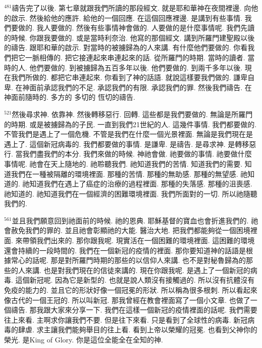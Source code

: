 \documentclass{book}
\begin{document}
$^{481}$禱告完了以後.
第七章就跟我們所讀的那段經文.
就是耶和華神在夜間裡邊.
向他的啟示.
然後給他的應許.
給他的一個回應.
在這個回應裡邊.
是講到有些事情.
我們要做的.
我人要做的.
然後有些事情神會做的.
人要做的是什麼事情呢.
我們先讀的時候.
你跟我要做的.
或是當時利奈治.
他寫的那個經文.
講到所羅門建聖殿以後的禱告.
跟耶和華的啟示.
對當時的被擄歸為的人來講.
有什麼他們要做的.
你看我們把它一脈相傳的.
把它接連起來串連起來的話.
從所羅門的時期.
當時的讀者.
當時的人.
他們要做的.
到被擄歸為五百多年以後.
他們要做的.
到兩千多年以後.
現在我們所做的.
都把它串連起來.
你看到了神的話語.
就說這樣要我們做的.
謙卑自卑.
在神面前承認我們的不足.
承認我們的有限.
承認我們的罪.
然後我們禱告.
在神面前隨時的.
多方的 多切的 恆切的禱告.

$^{521}$然後尋求神.
依靠神.
然後轉移惡行.
回轉.
這些都是我們要做的.
無論是所羅門的時期.
或是被擄歸為的子民.
一直到我們21世紀的人.
這幾件事情.
我們都要做的.
不管我們是遇上了一個危機.
不管是我們在什麼一個光景裡面.
無論是我們現在是遇上了.
這個新冠病毒的.
我們都要做的事情.
是謙卑.
是禱告.
是尋求神.
是轉移惡行.
當我們盡我們的本分.
我們來做的時候.
神祂會做.
祂要做的事情.
祂要做什麼事情呢.
祂會在天上隨地的.
祂聆聽我們.
祂知道我們的苦情.
知道我們的需要.
知道我們在一種被隔離的環境裡面.
那種的苦情.
那種的無助感.
那種的無望感.
祂知道的.
祂知道我們在遇上了癌症的治療的過程裡面.
那種的失落感.
那種的沮喪感.
祂知道的.
祂知道我們在一個經濟的困難環境裡面.
我們所面對的一切.
所以祂隨聽我們的.

$^{561}$並且我們願意回到祂面前的時候.
祂的恩典.
耶穌基督的寶血也會折進我們的.
祂會赦免我們的罪的.
並且祂會彰顯祂的大能.
醫治大地.
把我們都能夠從一個困境裡面.
來帶領我們出來的.
那你跟我呢.
現實活在一個困難的環境裡面.
這困難的環境還會持續的一段時間的.
我們在一個新冠的疫情的裡面.
那你要知道神的話語是根據常心的話呢.
那是對所羅門時期的那些的以信仰人來講.
也不是對秘魯歸為的那些的人來講.
也是對我們現在的信徒來講的.
現在你跟我呢.
是遇上了一個新冠的病毒.
這個新冠呢.
因為它是新型的.
也就是說人類沒有接觸過的.
所以沒有抗體沒有免疫的能力的.
並且它的形狀好像一個冠冕的形狀.
所以稱為很多根刺.
所以看起來像古代的一個王冠的.
所以叫新冠.
那我曾經在教會裡面寫了一個小文章.
也做了一個禱告.
那我跟大家來分享一下.
我們在這樣一個新冠的疫情裡面的話呢.
我們需要往上來看.
主啊求你讓我們不要.
但是往下來看.
只是看到了全球性的病毒.
新冠病毒的肆虐.
求主讓我們能夠舉目的往上看.
看到上帝以榮耀的冠冕.
也看到父神你的榮光.
是King of Glory.
你是這位全能全在全知的神.
\end{document}
